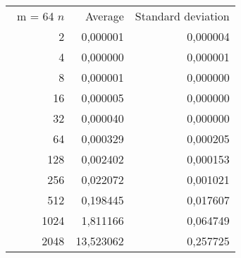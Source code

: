 \begin{tabular}{rrr}\
m = 64
 $n$ & Average & Standard deviation  \\
2 &  0,000001 &  0,000004 \\ 
4 &  0,000000 &  0,000001 \\ 
8 &  0,000001 &  0,000000 \\ 
16 &  0,000005 &  0,000000 \\ 
32 &  0,000040 &  0,000000 \\ 
64 &  0,000329 &  0,000205 \\ 
128 &  0,002402 &  0,000153 \\ 
256 &  0,022072 &  0,001021 \\ 
512 &  0,198445 &  0,017607 \\ 
1024 &  1,811166 &  0,064749 \\ 
2048 &  13,523062 &  0,257725 \\ 
\end{tabular}
